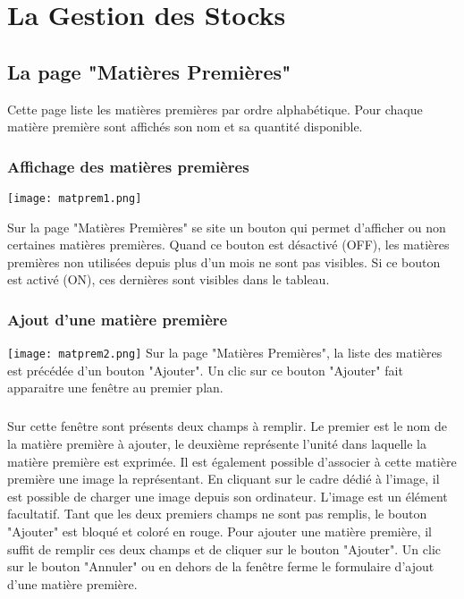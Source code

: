 \chapter{La Gestion des Stocks}

\section{La page "Matières Premières"}
Cette page liste les matières premières par ordre alphabétique. Pour chaque 
matière première sont affichés son nom et sa quantité disponible.

\subsection{Affichage des matières premières}

\texttt{[image: matprem1.png]}

Sur la page "Matières Premières" se site un bouton qui permet d'afficher ou non 
certaines matières premières. Quand ce bouton est désactivé (OFF), les matières 
premières non utilisées depuis plus d'un mois ne sont pas visibles. Si ce bouton
 est activé (ON), ces dernières sont visibles dans le tableau.


\subsection{Ajout d'une matière première}
\texttt{[image: matprem2.png]}
Sur la page "Matières Premières", la liste des matières est précédée d'un bouton
 "Ajouter". 
Un clic sur ce bouton "Ajouter" fait apparaitre une fenêtre au premier plan. 

\paragraph{}
Sur cette fenêtre sont présents deux champs à remplir. Le premier est le nom de 
la matière première à ajouter, le deuxième représente l'unité dans laquelle la 
matière première est exprimée. Il est également possible d'associer à cette 
matière première une image la représentant. En cliquant sur le cadre dédié à 
l'image, il est possible de charger une image depuis son ordinateur. L'image est
un élément facultatif. Tant que les deux premiers champs ne sont pas remplis, 
le bouton "Ajouter" est bloqué et coloré en rouge. Pour ajouter une matière 
première, il suffit de remplir ces deux champs et de cliquer sur le bouton 
"Ajouter". Un clic sur le bouton "Annuler" ou en dehors de la fenêtre ferme 
le formulaire d'ajout d'une matière première.


